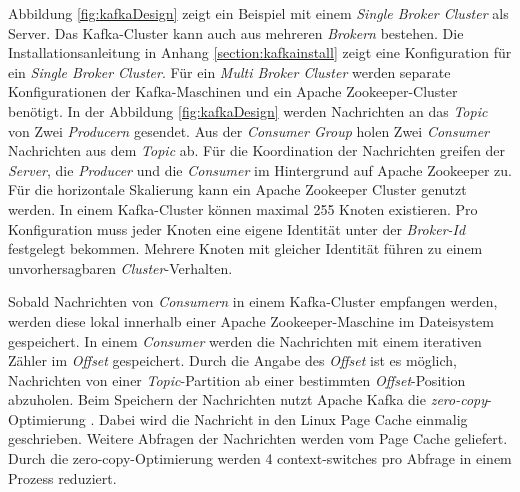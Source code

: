 Abbildung \ref{fig:kafkaDesign} zeigt ein Beispiel mit einem \textit{Single Broker Cluster} als Server. Das Kafka-Cluster kann auch aus mehreren \textit{Brokern} bestehen. Die Installationsanleitung in Anhang \ref{section:kafkainstall} zeigt eine Konfiguration für ein \textit{Single Broker Cluster}. Für ein \textit{Multi Broker Cluster} werden separate Konfigurationen der Kafka-Maschinen und ein Apache Zookeeper-Cluster benötigt. In der Abbildung \ref{fig:kafkaDesign} werden Nachrichten an das \textit{Topic} von Zwei \textit{Producern} gesendet. Aus der \textit{Consumer Group} holen Zwei \textit{Consumer} Nachrichten aus dem \textit{Topic} ab. Für die Koordination der Nachrichten greifen der \textit{Server}, die \textit{Producer} und die \textit{Consumer} im Hintergrund auf Apache Zookeeper zu. Für die horizontale Skalierung kann ein Apache Zookeeper Cluster genutzt werden. In einem Kafka-Cluster können maximal 255 Knoten existieren. Pro Konfiguration muss jeder Knoten eine eigene Identität unter der \textit{Broker-Id} festgelegt bekommen. Mehrere Knoten mit gleicher Identität führen zu einem unvorhersagbaren \textit{Cluster}-Verhalten. 

Sobald Nachrichten von \textit{Consumern} in einem Kafka-Cluster empfangen werden, werden diese lokal innerhalb einer Apache Zookeeper-Maschine im Dateisystem gespeichert. In einem \textit{Consumer} werden die Nachrichten mit einem iterativen Zähler im \textit{Offset} gespeichert. Durch die Angabe des \textit{Offset} ist es möglich, Nachrichten von einer \textit{Topic}-Partition ab einer bestimmten \textit{Offset}-Position abzuholen. Beim Speichern der Nachrichten nutzt Apache Kafka die \textit{zero-copy}-Optimierung . Dabei wird die Nachricht in den Linux Page Cache einmalig geschrieben. Weitere Abfragen der Nachrichten werden vom Page Cache geliefert. Durch die zero-copy-Optimierung werden 4 context-switches pro Abfrage in einem Prozess reduziert. 

